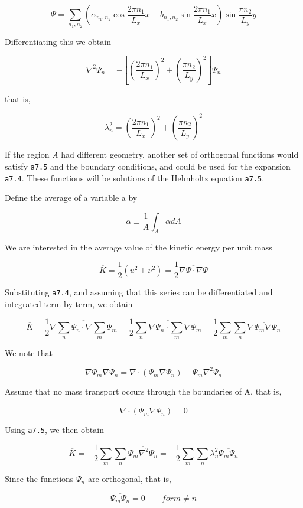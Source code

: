 \[\Psi = \sum_{n_1, n_2} \left( \alpha_{n_1, n_2}\cos{\frac{2\pi n_1}{L_x}x}+
b_{n_1, n_2}\sin{\frac{2\pi n_1}{L_x}x} \right)\sin{ \frac{\pi n_2}{L_y} y}\]

Differentiating this we obtain

\[\nabla^2\Psi_n = - \left\lbrack \left( \frac{2\pi n_1}{L_x} \right)^{2} +
\left( \frac{\pi n_2}{L_y}  \right)^{2} \right\rbrack\Psi_{n}\]

that is,

\[\lambda_n^2 = \left( \frac{2\pi n_1}{L_x} \right)^{2} + \left( \frac{\pi n_2}{L_y} \right)^{2}\]

If the region \emph{A} had different geometry, another set of orthogonal
functions would satisfy \texttt{a7.5} and the boundary conditions, and
could be used for the expansion \texttt{a7.4}. These functions will be
solutions of the Helmholtz equation \texttt{a7.5}.

Define the average of a variable a by

\[\overline{\alpha} \equiv \frac{1}{A}\int_A \alpha d A\]

We are interested in the average value of the kinetic energy per unit
mass

\[\overline{K} = \frac{1}{2}\overline{( u^{2} + \nu^{2} ) } = \frac{1}{2}\overline{\nabla\Psi\cdot\nabla\Psi}\]

Substituting \texttt{a7.4}, and assuming that this series can be
differentiated and integrated term by term, we obtain

\[\overline{K} = \frac{1}{2}\overline{ \nabla \sum_n\Psi_n\cdot\nabla\sum_m \Psi_m }
= \frac{1}{2}\overline{  \sum_n\nabla\Psi_n\cdot\sum_m \nabla\Psi_m }
= \frac{1}{2}\sum_m\sum_n \overline{ \nabla\Psi_m \nabla\Psi_n }\]

We note that

\[\nabla\Psi_m \nabla\Psi_n =\nabla \cdot \left( \Psi_m\nabla\Psi_n \right) - \Psi_m\nabla^2\Psi_n\]

Assume that no mass transport occurs through the boundaries of A, that
is,

\[\overline{\nabla\cdot\left( \Psi_{m}\nabla\Psi_{n} \right)} = 0\]

Using \texttt{a7.5}, we then obtain

\[\overline{K} = -\frac{1}{2}\sum_m\sum_n \overline{ \Psi_m \nabla^2\Psi_n }
= -\frac{1}{2}\sum_m\sum_n \lambda_n^2\overline{ \Psi_m \Psi_n }\]

Since the functions \(\Psi_{n}\) are orthogonal, that is,

\[\overline{ \Psi_m \Psi_n } = 0 \qquad for m \neq n\]

